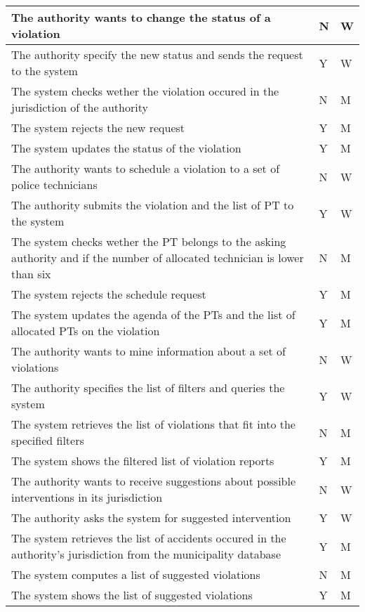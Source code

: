 \begin{longtable}{| p{} | p{} | p{} |}
      The authority wants to change the status of a violation & N & W\\
      \hline
      The authority specify the new status and sends the request to the system & Y & W\\
      \hline
      The system checks wether the violation occured in the jurisdiction of the authority & N & M\\
      \hline
      The system rejects the new request & Y & M\\
      \hline
      The system updates the status of the violation & Y & M\\
      \hline
      
      The authority wants to schedule a violation to a set of police technicians & N & W\\
      \hline
      The authority submits the violation and the list of PT to the system & Y & W\\
      \hline
      The system checks wether the PT belongs to the asking authority and if the number of allocated technician is lower than six& N & M\\
      \hline
      The system rejects the schedule request & Y & M\\
      \hline
      The system updates the agenda of the PTs and the list of allocated PTs on the violation & Y & M\\
      \hline

      The authority wants to mine information about a set of violations & N & W\\
      \hline
      The authority specifies the list of filters and queries the system & Y & W\\
      \hline
      The system retrieves the list of violations that fit into the specified filters & N & M\\
      \hline
      The system shows the filtered list of violation reports & Y & M\\
      \hline

      The authority wants to receive suggestions about possible interventions in its jurisdiction & N & W\\
      \hline
      The authority asks the system for suggested intervention & Y & W\\
      \hline
      The system retrieves the list of accidents occured in the authority's jurisdiction from the municipality database & Y & M\\
      \hline
      The system computes a list of suggested violations & N & M\\
      \hline
      The system shows the list of suggested violations & Y & M\\
      \hline
  \end{longtable}
